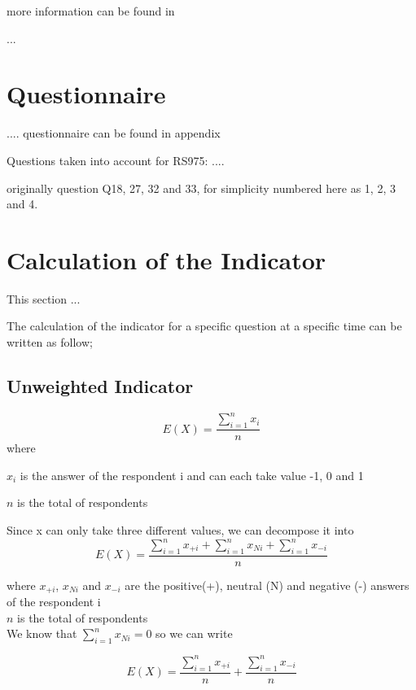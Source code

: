 \documentclass[12pt,a4paper,oneside]{book}
\begin{document}
more information can be found in \cite{de_greef_national_2009}



...

\section{Questionnaire}
.... questionnaire can be found in appendix %


Questions taken into account for RS975:
....

originally question Q18, 27, 32 and 33, for simplicity numbered here as 1, 2, 3 and 4.


\newpage

\section{Calculation of the Indicator}

This section ...

The calculation of the indicator for a specific question at a specific time can be written as follow;

\subsection{Unweighted Indicator}

\begin{equation}
    E(X) = \frac{ \sum_{i=1}^n x_i}{n}
\end{equation} 
where 

$x_i$ is the answer of the respondent i and can each take value -1, 0 and 1 

$n$ is the total of respondents

Since x can only take three different values, we can decompose it into 
\begin{equation}
    E(X) = \frac{ \sum_{i=1}^n x_{+i} + \sum_{i=1}^n x_{Ni} + \sum_{i=1}^n x_{-i}}{n}
\end{equation} 

where 
$x_{+i}$, $x_{Ni}$ and $x_{-i}$ are the positive(+), neutral (N) and negative (-) answers of the respondent i \\
$n$ is the total of respondents\\

We know that $\sum_{i=1}^n x_{Ni} = 0$ so we can write

\begin{equation}
    E(X) = \frac{\sum_{i=1}^n x_{+i}}{n}  + \frac{\sum_{i=1}^n x_{-i}}{n}
\end{equation} 
\end{document}
